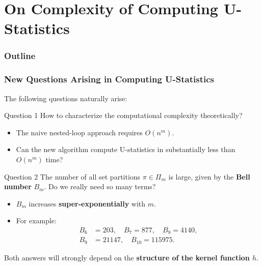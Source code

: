 \documentclass[9pt]{beamer}
\theoremstyle{mystyle}
\theoremstyle{mystyletwo}
\newcommand{\partition}{\Pi}
\newcommand{\partitionp}[1]{\partition_{#1}}
\begin{document}
\section{On Complexity of Computing  U-Statistics}
\begin{frame}
    \frametitle{Outline}
    \tableofcontents[currentsection, sectionstyle=show/shaded, subsectionstyle=show/shaded/shaded]
\end{frame}

\begin{frame}
    \frametitle{New Questions Arising in Computing U-Statistics}
    The following questions naturally arise:
    
    \begin{block}{Question 1}
        How to characterize the computational complexity theoretically?
    \end{block}
    \begin{itemize}
        \item The naive nested-loop approach requires {\color{red}$O(n^m)$}.
        \item Can the new algorithm compute U-statistics in {\color{red}substantially less than $O(n^m)$} time?
    \end{itemize}

\begin{block}{Question 2}
    The number of all set partitions $\pi \in \partitionp{m}$ is large, given by the \textbf{Bell number} $B_m$. 
    Do we really need so many terms?
    \begin{itemize}
        \item $B_m$ increases \textbf{super-exponentially} with $m$.
        \item For example:
        \begin{align*}
        B_6 &= 203, \quad B_7 = 877, \quad B_8 = 4140, \\ B_9 &= 21147, \quad B_{10} = 115975.
        \end{align*}
    \end{itemize}
\end{block}


    \vspace{0.2cm}
    \centering
    Both answers will strongly depend on the \textbf{structure of the kernel function $h$}.
\end{frame}
\end{document}
